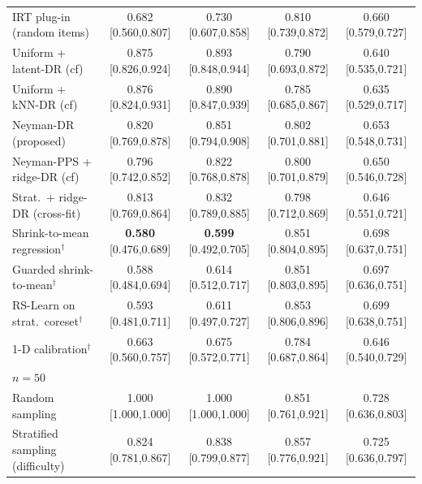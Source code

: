 \begin{tabular}{l cccc}
IRT plug-in (random items) & 0.682 {\scriptsize[0.560,0.807]} & 0.730 {\scriptsize[0.607,0.858]} & 0.810 {\scriptsize[0.739,0.872]} & 0.660 {\scriptsize[0.579,0.727]} \\
Uniform + latent-DR (cf) & 0.875 {\scriptsize[0.826,0.924]} & 0.893 {\scriptsize[0.848,0.944]} & 0.790 {\scriptsize[0.693,0.872]} & 0.640 {\scriptsize[0.535,0.721]} \\
Uniform + kNN-DR (cf) & 0.876 {\scriptsize[0.824,0.931]} & 0.890 {\scriptsize[0.847,0.939]} & 0.785 {\scriptsize[0.685,0.867]} & 0.635 {\scriptsize[0.529,0.717]} \\
Neyman-DR (proposed) & 0.820 {\scriptsize[0.769,0.878]} & 0.851 {\scriptsize[0.794,0.908]} & 0.802 {\scriptsize[0.701,0.881]} & 0.653 {\scriptsize[0.548,0.731]} \\
Neyman-PPS + ridge-DR (cf) & 0.796 {\scriptsize[0.742,0.852]} & 0.822 {\scriptsize[0.768,0.878]} & 0.800 {\scriptsize[0.701,0.879]} & 0.650 {\scriptsize[0.546,0.728]} \\
Strat.\ + ridge-DR (cross-fit) & 0.813 {\scriptsize[0.769,0.864]} & 0.832 {\scriptsize[0.789,0.885]} & 0.798 {\scriptsize[0.712,0.869]} & 0.646 {\scriptsize[0.551,0.721]} \\
Shrink-to-mean regression$^\dagger$ & \textbf{0.580} {\scriptsize[0.476,0.689]} & \textbf{0.599} {\scriptsize[0.492,0.705]} & 0.851 {\scriptsize[0.804,0.895]} & 0.698 {\scriptsize[0.637,0.751]} \\
Guarded shrink-to-mean$^\dagger$ & 0.588 {\scriptsize[0.484,0.694]} & 0.614 {\scriptsize[0.512,0.717]} & 0.851 {\scriptsize[0.803,0.895]} & 0.697 {\scriptsize[0.636,0.751]} \\
RS-Learn on strat.\ coreset$^\dagger$ & 0.593 {\scriptsize[0.481,0.711]} & 0.611 {\scriptsize[0.497,0.727]} & 0.853 {\scriptsize[0.806,0.896]} & 0.699 {\scriptsize[0.638,0.751]} \\
1-D calibration$^\dagger$ & 0.663 {\scriptsize[0.560,0.757]} & 0.675 {\scriptsize[0.572,0.771]} & 0.784 {\scriptsize[0.687,0.864]} & 0.646 {\scriptsize[0.540,0.729]} \\
\midrule
\multicolumn{5}{l}{\emph{$n=50$}}\\
Random sampling & 1.000 {\scriptsize[1.000,1.000]} & 1.000 {\scriptsize[1.000,1.000]} & 0.851 {\scriptsize[0.761,0.921]} & 0.728 {\scriptsize[0.636,0.803]} \\
Stratified sampling (difficulty) & 0.824 {\scriptsize[0.781,0.867]} & 0.838 {\scriptsize[0.799,0.877]} & 0.857 {\scriptsize[0.776,0.921]} & 0.725 {\scriptsize[0.636,0.797]} \\

\end{tabular}

